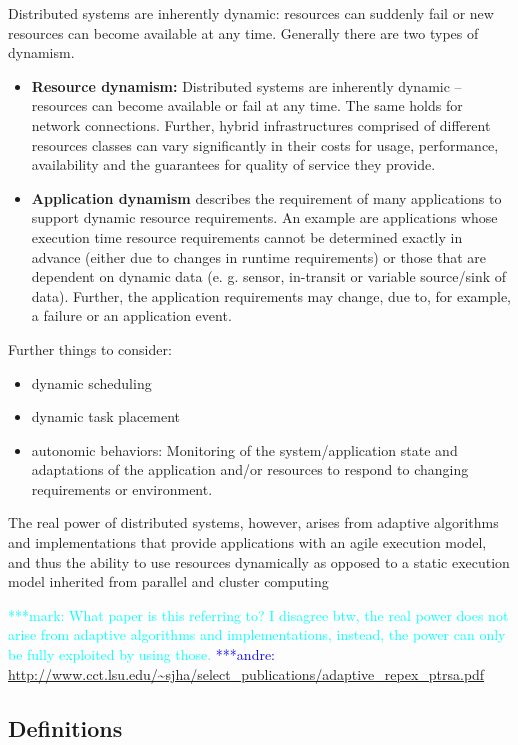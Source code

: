 \documentclass[]{article}
\newcommand{\alnote}[1]{ {\textcolor{blue} { ***andre: #1 }}}
\newcommand{\msnote}[1]{ {\textcolor{cyan} { ***mark: #1 }}}
\newcommand{\alnote}[1]{}
\begin{document}
Distributed systems are inherently dynamic: resources can suddenly fail or 
new resources can become available at any time. Generally there are two types
of dynamism.
\begin{itemize}
    \item \textbf{Resource dynamism:} Distributed systems are inherently dynamic
     -- resources can become available or fail at any time. The same holds for
      network connections. Further, hybrid infrastructures comprised of 
      different resources classes can vary significantly in their costs for 
      usage, performance, availability and the guarantees for quality of service 
      they provide.
      
	\item \textbf{Application dynamism} describes the requirement of many
applications to support dynamic resource requirements. An example are
applications whose execution time resource requirements cannot be determined
exactly in advance (either due to changes in runtime requirements) or those that
are dependent on dynamic data (e. g. sensor, in-transit or variable source/sink
of data). Further, the application requirements may change, due to,
for example, a failure or an application event.
\end{itemize}

Further things to consider:
\begin{itemize}
    \item dynamic scheduling
    \item dynamic task placement
    \item autonomic behaviors: Monitoring of the system/application state and 
    adaptations of the application and/or resources to respond to changing 
    requirements or environment.
\end{itemize}

The real power of distributed systems, however, arises from adaptive algorithms
and implementations that provide applications with an agile execution model, and
thus the ability to use resources dynamically as opposed to a static execution
model inherited from parallel and cluster computing

\msnote{What paper is this referring to? I disagree btw, the real power does not arise from adaptive algorithms and implementations, instead, the power can only be fully exploited by using those.}\alnote{\url{http://www.cct.lsu.edu/~sjha/select_publications/adaptive_repex_ptrsa.pdf}}

\subsection{Definitions}
\end{document}
